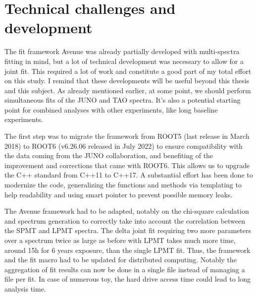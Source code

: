 \documentclass[../main.tex]{subfiles}
\begin{document}
%

%
%
%
\section{Technical challenges and development}
\label{sec:joint_fit:tech}

The fit framework Avenue was already partially developed with multi-spectra fitting in mind, but a lot of technical development was necessary to allow for a joint fit. This required a lot of work and constitute a good part of my total effort on this study. I remind that these developments will be useful beyond this thesis and this subject. As already mentioned earlier, at some point, we should perform simultaneous fits of the JUNO and TAO spectra. It's also a potential starting  point for combined analyses with other experiments, like long baseline experiments.

The first step was to migrate the framework from ROOT5 (last release in March 2018) to ROOT6 (v6.26.06 released in July 2022) to ensure compatibility with the data coming from the JUNO collaboration, and benefiting of the improvement and corrections that came with ROOT6. This allows us to upgrade the C++ standard from C++11 to C++17. A substantial effort has been done to modernize the code, generalizing the functions and methods via templating to help readability and using smart pointer to prevent possible memory leaks.

The Avenue framework had to be adapted, notably on the chi-square calculation and spectrum generation to correctly take into account the correlation between the SPMT and LPMT spectra. The delta joint fit requiring two more parameters over a spectrum twice as large as before with LPMT takes much more time, around 15h for 6 years exposure, than the single LPMT fit. Thus, the framework and the fit macro had to be updated for distributed computing. Notably the aggregation of fit results can now be done in a single file instead of managing a file per fit. In case of numerous toy, the hard drive access time could lead to long analysis time.
\end{document}
